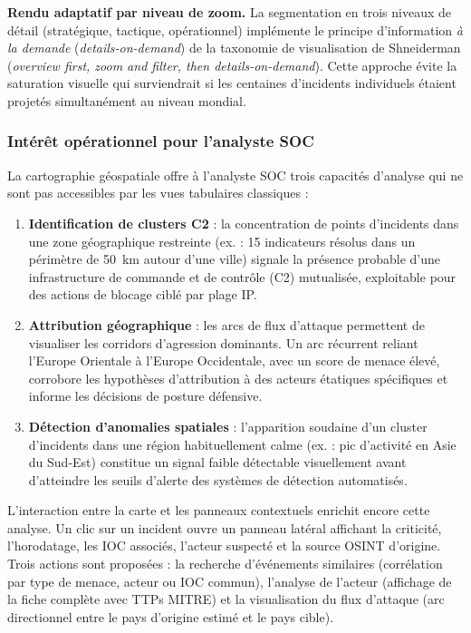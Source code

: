\textbf{Rendu adaptatif par niveau de zoom.} La segmentation en trois niveaux de détail (stratégique, tactique, opérationnel) implémente le principe d'information \textit{à la demande} (\textit{details-on-demand}) de la taxonomie de visualisation de Shneiderman (\textit{overview first, zoom and filter, then details-on-demand}). Cette approche évite la saturation visuelle qui surviendrait si les centaines d'incidents individuels étaient projetés simultanément au niveau mondial.

\subsubsection{Intérêt opérationnel pour l'analyste SOC}

La cartographie géospatiale offre à l'analyste SOC trois capacités d'analyse qui ne sont pas accessibles par les vues tabulaires classiques :

\begin{enumerate}
    \item \textbf{Identification de clusters C2} : la concentration de points d'incidents dans une zone géographique restreinte (ex. : 15 indicateurs résolus dans un périmètre de 50~km autour d'une ville) signale la présence probable d'une infrastructure de commande et de contrôle (C2) mutualisée, exploitable pour des actions de blocage ciblé par plage IP.
    \item \textbf{Attribution géographique} : les arcs de flux d'attaque permettent de visualiser les corridors d'agression dominants. Un arc récurrent reliant l'Europe Orientale à l'Europe Occidentale, avec un score de menace élevé, corrobore les hypothèses d'attribution à des acteurs étatiques spécifiques et informe les décisions de posture défensive.
    \item \textbf{Détection d'anomalies spatiales} : l'apparition soudaine d'un cluster d'incidents dans une région habituellement calme (ex. : pic d'activité en Asie du Sud-Est) constitue un signal faible détectable visuellement avant d'atteindre les seuils d'alerte des systèmes de détection automatisés.
\end{enumerate}

L'interaction entre la carte et les panneaux contextuels enrichit encore cette analyse. Un clic sur un incident ouvre un panneau latéral affichant la criticité, l'horodatage, les IOC associés, l'acteur suspecté et la source OSINT d'origine. Trois actions sont proposées : la recherche d'événements similaires (corrélation par type de menace, acteur ou IOC commun), l'analyse de l'acteur (affichage de la fiche complète avec TTPs MITRE) et la visualisation du flux d'attaque (arc directionnel entre le pays d'origine estimé et le pays cible).

